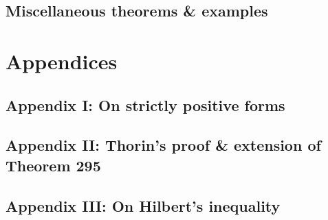 \documentclass[oneside]{book}
\numberwithin{equation}{section}
\begin{document}
\subsection{Miscellaneous theorems \& examples}


\section{Appendices}

\subsection{Appendix I: On strictly positive forms}

\subsection{Appendix II: Thorin's proof \& extension of Theorem 295}

\subsection{Appendix III: On Hilbert's inequality}



\printbibliography[heading=bibintoc]
	
\end{document}
